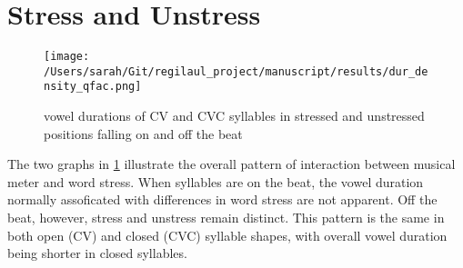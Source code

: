 %
% 
% 


\section{Stress and Unstress}

\begin{figure}[ht]
\centering
\texttt{[image: /Users/sarah/Git/regilaul\_project/manuscript/results/dur\_density\_qfac.png]}
\caption{vowel durations of CV and CVC syllables in stressed and unstressed positions falling on and off the beat}
\label{durstrick}
\end{figure}

The two graphs in \ref{durstrick} illustrate the overall pattern of interaction between musical meter and word stress. When syllables are on the beat, the vowel duration normally assoficated with differences in word stress are not apparent. Off the beat, however, stress and unstress remain distinct. This pattern is the same in both open (CV) and closed (CVC) syllable shapes, with overall vowel duration being shorter in closed syllables. 



